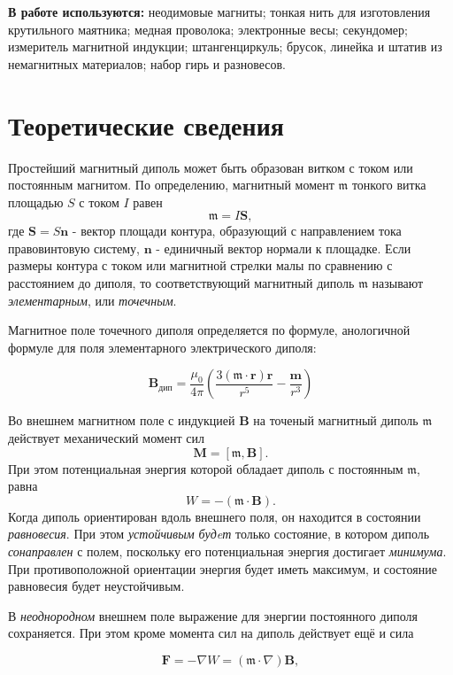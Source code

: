 \documentclass[a4paper,12pt]{article} %
\begin{document}
\textbf{В работе используются:} неодимовые магниты; тонкая нить для изготовления крутильного маятника; медная проволока; электронные весы; секундомер; измеритель магнитной индукции; штангенциркуль; брусок, линейка и штатив из немагнитных материалов; набор гирь и разновесов.

\section{Теоретические сведения}

Простейший магнитный диполь может быть образован витком с током или постоянным магнитом. По определению, магнитный момент $\mathfrak{m}$ тонкого витка площадью $S$ с током $I$ равен $$\mathfrak{m} = I\textbf{S},$$ где $\textbf{S} = S\textbf{n}$ - вектор площади контура, образующий с направлением тока правовинтовую систему, $\textbf{n}$ - единичный вектор нормали к площадке. Если размеры контура с током или магнитной стрелки малы по сравнению с расстоянием до диполя, то соответствующий магнитный диполь $\mathfrak{m}$ называют \textit{элементарным}, или \textit{точечным}.

Магнитное поле точечного диполя определяется по формуле, анологичной формуле для поля элементарного электрического диполя:

\begin{equation}
    \textbf{B}_\text{дип} = \frac{\mu_0}{4\pi}\left(\frac{3(\mathfrak{m} \cdot \textbf{r})\textbf{r}}{r^5} - \frac{\textbf{m}}{r^3}\right)
    \label{2}
\end{equation}


Во внешнем магнитном поле с индукцией $\textbf{B}$ на точеный магнитный диполь $\mathfrak{m}$ действует механический момент сил $$\textbf{M}=[\mathfrak{m}, \textbf{B}].$$
При этом потенциальная энергия которой обладает диполь с постоянным $\mathfrak{m}$, равна 
$$W = -(\mathfrak{m} \cdot \textbf{B}).$$
Когда диполь ориентирован вдоль внешнего поля, он находится в состоянии \textit{равновесия}. При этом \textit{устойчивым будeт} только состояние, в котором диполь \textit{сонаправлен} с полем, поскольку его потенциальная энергия достигает \textit{минимума}. При противоположной ориентации энергия будет иметь максимум, и состояние равновесия будет неустойчивым.

В \textit{неоднородном} внешнем поле выражение для энергии постоянного диполя сохраняется. При этом кроме момента сил на диполь действует ещё и сила 

\[\textbf{F} = -\nabla W = (\mathfrak{m} \cdot \nabla)\textbf{B},\]
\end{document}
